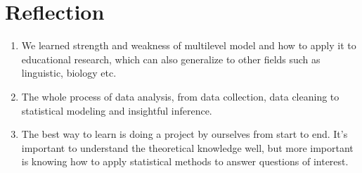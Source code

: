 \documentclass[11pt,a4paper]{article}
\begin{document}
\section{Reflection}

\begin{enumerate}
    \item We learned strength and weakness of multilevel model and
    how to apply it to educational research, which can also generalize to other fields such as linguistic, biology etc. 


    \item The whole process of data analysis, from data collection, data cleaning to statistical modeling and insightful inference.


    \item The best way to learn is doing a project by ourselves from start to end. It’s important to understand the theoretical 
    knowledge well, but more important is knowing how to apply statistical methods to answer questions of interest.
\end{enumerate}
\end{document}
